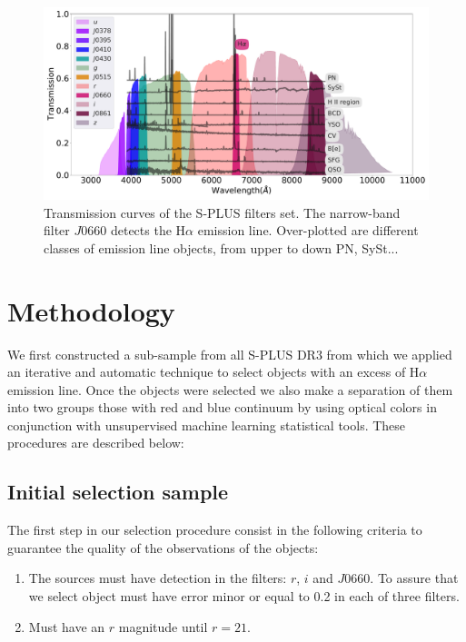 \documentclass[fleqn,usenatbib]{mnras}
\begin{document}
\begin{figure}
    \includegraphics[width=0.9\linewidth]{Figs/splus-filter.pdf}
    \caption{Transmission curves of the S-PLUS filters set. The narrow-band filter
      $J0660$ detects the H$\alpha$ emission line. Over-plotted are different
      classes of emission line objects, from upper to down PN, SySt... }
    \label{fig:curves}
\end{figure}

\section{Methodology}
\label{sec:metho}

We first constructed a sub-sample from all S-PLUS DR3 from which we
applied an iterative and automatic technique to select objects with
an excess of H{$\alpha$} emission line. Once the objects were selected
we also make a separation of them into two groups those with red and blue
continuum by using optical colors in conjunction with unsupervised
 machine learning statistical tools. These procedures are described below:

\subsection{Initial selection sample}
\label{sec:}

The first step in our selection procedure consist in the following
criteria to guarantee the quality of the observations of the objects:

\begin{enumerate}
\item The sources must have detection in the filters: $r$, $i$ and
  $J$0660. To assure that we select object must have error minor or
  equal to 0.2 in each of three filters.

\item Must have an $r$ magnitude until $r = 21$.
  
\end{enumerate}
\end{document}
